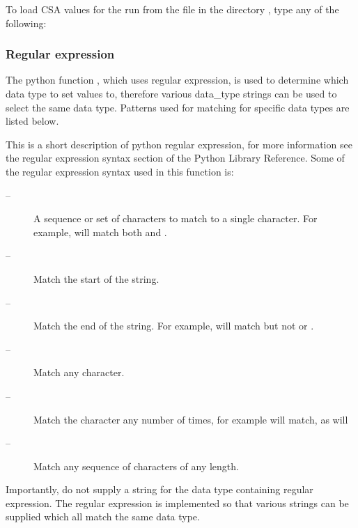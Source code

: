 To load CSA values for the run 
 from the file 
 in the directory 
, type
any of the following:








\subsubsection{Regular expression}

The python function 
, which uses regular expression, is used to determine which data
type to set values to, therefore various data\_type strings can be used to select the same
data type.  Patterns used for matching for specific data types are listed below.

This is a short description of python regular expression, for more information see the
regular expression syntax section of the Python Library Reference.  Some of the regular
expression syntax used in this function is:

\begin{description}
\item[    
 --]   A sequence or set of characters to match to a single character.  For example, 
 will match both 
 and 
. 
\item[    
 --]   Match the start of the string. 
\item[    
 --]   Match the end of the string.  For example, 
 will match 
 but not 
 or 
. 
\item[    
 --]   Match any character. 
\item[    
 --]   Match the character 
 any number of times, for example 
 will match, as will 
 
\item[    
 --]   Match any sequence of characters of any length. 
\end{description}
Importantly, do not supply a string for the data type containing regular expression.  The
regular expression is implemented so that various strings can be supplied which all match
the same data type.


